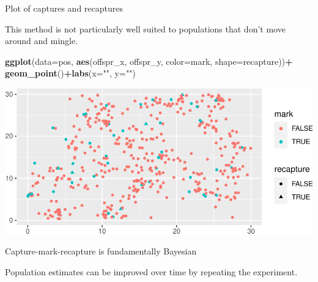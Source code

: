 \documentclass[
  ignorenonframetext,
]{beamer}
\newenvironment{Shaded}{\begin{snugshade}}{\end{snugshade}}
\newcommand{\DataTypeTok}[1]{\textcolor[rgb]{0.13,0.29,0.53}{#1}}
\newcommand{\KeywordTok}[1]{\textcolor[rgb]{0.13,0.29,0.53}{\textbf{#1}}}
\newcommand{\NormalTok}[1]{#1}
\newcommand{\OperatorTok}[1]{\textcolor[rgb]{0.81,0.36,0.00}{\textbf{#1}}}
\newcommand{\StringTok}[1]{\textcolor[rgb]{0.31,0.60,0.02}{#1}}
\begin{document}
\begin{frame}[fragile]{Plot of captures and recaptures}
\protect\hypertarget{plot-of-captures-and-recaptures}{}

This method is not particularly well suited to populations that don't
move around and mingle.

\scriptsize

\begin{Shaded}
\begin{Highlighting}[]
\KeywordTok{ggplot}\NormalTok{(}\DataTypeTok{data=}\NormalTok{pos, }\KeywordTok{aes}\NormalTok{(offspr_x, offspr_y, }\DataTypeTok{color=}\NormalTok{mark, }\DataTypeTok{shape=}\NormalTok{recapture))}\OperatorTok{+}
\StringTok{  }\KeywordTok{geom_point}\NormalTok{()}\OperatorTok{+}\KeywordTok{labs}\NormalTok{(}\DataTypeTok{x=}\StringTok{""}\NormalTok{, }\DataTypeTok{y=}\StringTok{""}\NormalTok{)}
\end{Highlighting}
\end{Shaded}

\includegraphics{distance_sampling_files/figure-beamer/unnamed-chunk-6-1.pdf}

\end{frame}

\begin{frame}{Capture-mark-recapture is fundamentally Bayesian}
\protect\hypertarget{capture-mark-recapture-is-fundamentally-bayesian}{}

Population estimates can be improved over time by repeating the
experiment.

\end{frame}
\end{document}
